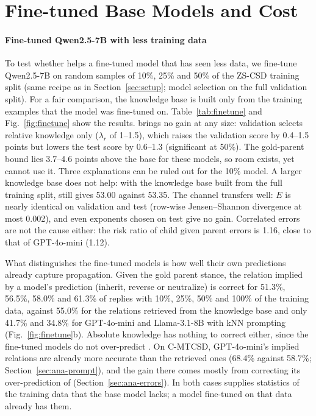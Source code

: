 \section{Fine-tuned Base Models and Cost}
\label{app:finetune}

\paragraph{Fine-tuned Qwen2.5-7B with less training data}
To test whether \spin{} helps a fine-tuned model that has seen less data, we fine-tune Qwen2.5-7B on random samples of 10\%, 25\% and 50\% of the ZS-CSD training split (same recipe as in Section~\ref{sec:setup}; model selection on the full validation split). For a fair comparison, the knowledge base is built only from the training examples that the model was fine-tuned on. Table~\ref{tab:finetune} and Fig.~\ref{fig:finetune} show the results. \spin{} brings no gain at any size: validation selects relative knowledge only ($\lambda_r$ of 1--1.5), which raises the validation score by 0.4--1.5 points but lowers the test score by 0.6--1.3 (significant at 50\%). The gold-parent bound lies 3.7--4.6 points above the base for these models, so room exists, yet \spin{} cannot use it. Three explanations can be ruled out for the 10\% model. A larger knowledge base does not help: with the knowledge base built from the full training split, \spin{} still gives 53.00 against 53.35. The channel transfers well: $E$ is nearly identical on validation and test (row-wise Jensen--Shannon divergence at most 0.002), and even exponents chosen on test give no gain. Correlated errors are not the cause either: the risk ratio of child given parent errors is 1.16, close to that of GPT-4o-mini (1.12).

What distinguishes the fine-tuned models is how well their own predictions already capture propagation. Given the gold parent stance, the relation implied by a model's prediction (inherit, reverse or neutralize) is correct for 51.3\%, 56.5\%, 58.0\% and 61.3\% of replies with 10\%, 25\%, 50\% and 100\% of the training data, against 55.0\% for the relations retrieved from the knowledge base and only 41.7\% and 34.8\% for GPT-4o-mini and Llama-3.1-8B with kNN prompting (Fig.~\ref{fig:finetune}b). Absolute knowledge has nothing to correct either, since the fine-tuned models do not over-predict \nonelabel{}. On C-MTCSD, GPT-4o-mini's implied relations are already more accurate than the retrieved ones (68.4\% against 58.7\%; Section~\ref{sec:ana-prompt}), and the gain there comes mostly from correcting its over-prediction of \nonelabel{} (Section~\ref{sec:ana-errors}). In both cases \spin{} supplies statistics of the training data that the base model lacks; a model fine-tuned on that data already has them.

